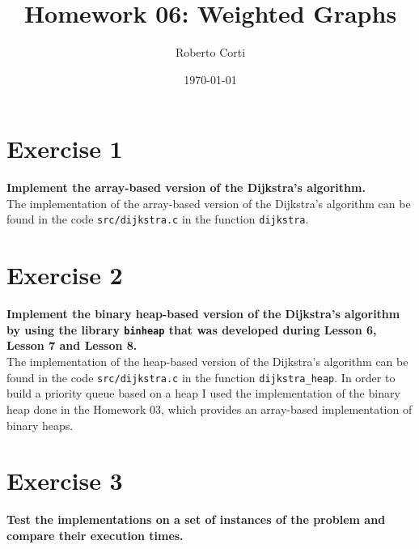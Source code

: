 \documentclass{article}
\title{Homework 06: Weighted Graphs}
\date{\today}
\author{Roberto Corti}
\begin{document}
	
	\maketitle
	
	\section*{Exercise 1}
	\textbf{Implement the array-based version of the Dijkstra’s algorithm.}\\
	
	\noindent The implementation of the array-based version of the Dijkstra’s algorithm can be found in the code \texttt{src/dijkstra.c} in the function \texttt{dijkstra}. 
	
	
	\section*{Exercise 2}
	\textbf{Implement the binary heap-based version of the Dijkstra’s algorithm by using the library \texttt{binheap} that was developed during Lesson 6, Lesson 7 and Lesson 8.}\\
	
	\noindent The implementation of the heap-based version of the Dijkstra’s algorithm can be found in the code \texttt{src/dijkstra.c} in the function \texttt{dijkstra\_heap}. In order to build a priority queue based on a heap I used the implementation of the binary heap done in the Homework 03, which provides an array-based implementation of binary heaps.
	
	\section*{Exercise 3}
	\textbf{Test the implementations on a set of instances of the problem and compare their execution times.}\\ 
	
\end{document}
